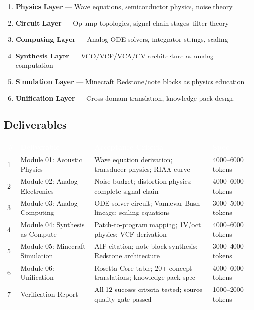 \documentclass[11pt,letterpaper]{article}
\newcommand{\tableheader}[1]{\textbf{\sffamily\textcolor{white}{#1}}}
\begin{document}
\begin{enumerate}[leftmargin=2em]
  \item \textbf{Physics Layer} --- Wave equations, semiconductor physics, noise theory
  \item \textbf{Circuit Layer} --- Op-amp topologies, signal chain stages, filter theory
  \item \textbf{Computing Layer} --- Analog ODE solvers, integrator strings, scaling
  \item \textbf{Synthesis Layer} --- VCO/VCF/VCA/CV architecture as analog computation
  \item \textbf{Simulation Layer} --- Minecraft Redstone/note blocks as physics education
  \item \textbf{Unification Layer} --- Cross-domain translation, knowledge pack design
\end{enumerate}

\subsection{Deliverables}

\begin{center}
\begin{tabularx}{\textwidth}{C{0.5cm}L{3.5cm}XL{3cm}}
\toprule
{}
\tableheader{\#} & \tableheader{Deliverable} & \tableheader{Acceptance Criteria} & \tableheader{Spec} \\
 & Module 01: Acoustic Physics & Wave equation derivation; transducer physics; RIAA curve & 4000--6000 tokens \\
2 & Module 02: Analog Electronics & Noise budget; distortion physics; complete signal chain & 4000--6000 tokens \\
3 & Module 03: Analog Computing & ODE solver circuit; Vannevar Bush lineage; scaling equations & 3000--5000 tokens \\
4 & Module 04: Synthesis as Compute & Patch-to-program mapping; 1V/oct physics; VCF derivation & 4000--6000 tokens \\
5 & Module 05: Minecraft Simulation & AIP citation; note block synthesis; Redstone architecture & 3000--4000 tokens \\
6 & Module 06: Unification & Rosetta Core table; 20+ concept translations; knowledge pack spec & 4000--6000 tokens \\
7 & Verification Report & All 12 success criteria tested; source quality gate passed & 1000--2000 tokens \\
\bottomrule
\end{tabularx}
\end{center}
\end{document}
